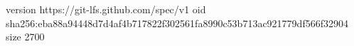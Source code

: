 version https://git-lfs.github.com/spec/v1
oid sha256:eba88a94448d7d4af4b717822f302561fa8990c53b713ac921779df566f32904
size 2700
